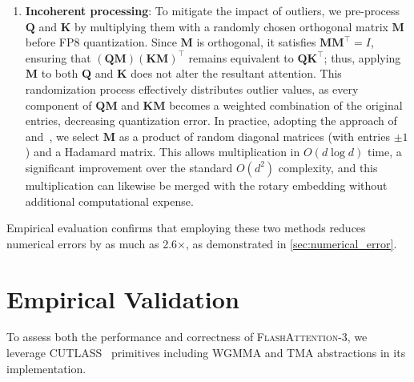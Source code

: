 \begin{algorithm}[H]
\begin{algorithmic}[1]
\begin{enumerate}
\item \textbf{Incoherent processing}: To mitigate the impact of outliers, we pre-process $\mathbf{Q}$ and $\mathbf{K}$ by multiplying them with a randomly chosen orthogonal matrix $\mathbf{M}$ before FP8 quantization. Since $\mathbf{M}$ is orthogonal, it satisfies $\mathbf{M} \mathbf{M}^\top = I$, ensuring that $(\mathbf{Q} \mathbf{M})(\mathbf{K} \mathbf{M})^\top$ remains equivalent to $\mathbf{Q} \mathbf{K}^\top$; thus, applying $\mathbf{M}$ to both $\mathbf{Q}$ and $\mathbf{K}$ does not alter the resultant attention. This randomization process effectively distributes outlier values, as every component of $\mathbf{Q} \mathbf{M}$ and $\mathbf{K} \mathbf{M}$ becomes a weighted combination of the original entries, decreasing quantization error. In practice, adopting the approach of \citet{chee2024quip} and~\citet{tseng2024quip}, we select $\mathbf{M}$ as a product of random diagonal matrices (with entries $\pm 1$) and a Hadamard matrix. This allows multiplication in $O(d \log d)$ time, a significant improvement over the standard $O(d^2)$ complexity, and this multiplication can likewise be merged with the rotary embedding without additional computational expense.
\end{enumerate}

Empirical evaluation confirms that employing these two methods reduces numerical errors by as much as 2.6$\times$, as demonstrated in \cref{sec:numerical_error}.

\section{Empirical Validation}
\label{sec:exp}

To assess both the performance and correctness of \textsc{FlashAttention-3}, we leverage CUTLASS~\citep{Thakkar_CUTLASS_2023} primitives including WGMMA and TMA abstractions in its implementation.

\begin{itemize}


\end{itemize}
\end{algorithmic}
\end{algorithm}
